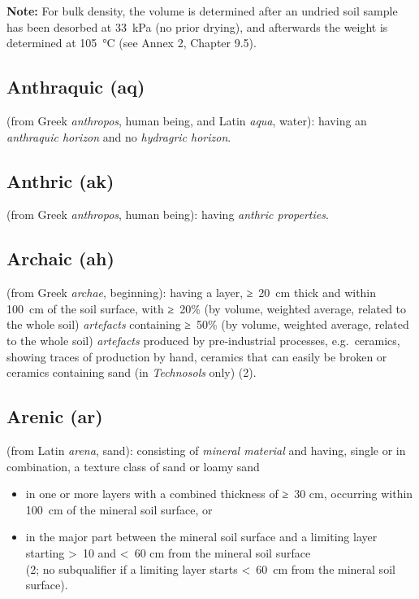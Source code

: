 \documentclass[
  letterpaper,
  DIV=11,
  numbers=noendperiod]{scrreprt}
\providecommand{\tightlist}{%
  \setlength{\itemsep}{0pt}\setlength{\parskip}{0pt}}\usepackage{longtable,booktabs,array}
\begin{document}
\textbf{Note:} For bulk density, the volume is determined after an
undried soil sample has been desorbed at 33~kPa (no prior drying), and
afterwards the weight is determined at 105~°C (see Annex 2, Chapter
9.5).

\hypertarget{anthraquic-aq}{%
\subsection{Anthraquic (aq)}\label{anthraquic-aq}}

(from Greek \emph{anthropos}, human being, and Latin \emph{aqua},
water): having an \emph{anthraquic horizon} and no \emph{hydragric
horizon}.

\hypertarget{anthric-ak}{%
\subsection{Anthric (ak)}\label{anthric-ak}}

(from Greek \emph{anthropos}, human being): having \emph{anthric
properties}.

\hypertarget{archaic-ah}{%
\subsection{Archaic (ah)}\label{archaic-ah}}

(from Greek \emph{archae}, beginning): having a layer, ≥~20~cm thick and
within 100~cm of the soil surface, with ≥~20\% (by volume, weighted
average, related to the whole soil) \emph{artefacts} containing ≥~50\%
(by volume, weighted average, related to the whole soil)
\emph{artefacts} produced by pre-industrial processes, e.g.~ceramics,
showing traces of production by hand, ceramics that can easily be broken
or ceramics containing sand (in \emph{Technosols} only) (2).

\hypertarget{arenic-ar}{%
\subsection{Arenic (ar)}\label{arenic-ar}}

(from Latin \emph{arena}, sand): consisting of \emph{mineral material}
and having, single or in combination, a texture class of sand or loamy
sand

\begin{itemize}
\tightlist
\item
  in one or more layers with a combined thickness of ≥~30 cm, occurring
  within 100~cm of the mineral soil surface, or
\item
  in the major part between the mineral soil surface and a limiting
  layer starting \textgreater~10 and \textless~60 cm from the mineral
  soil surface\\
  (2; no subqualifier if a limiting layer starts \textless~60~cm from
  the mineral soil surface).
\end{itemize}
\end{document}
